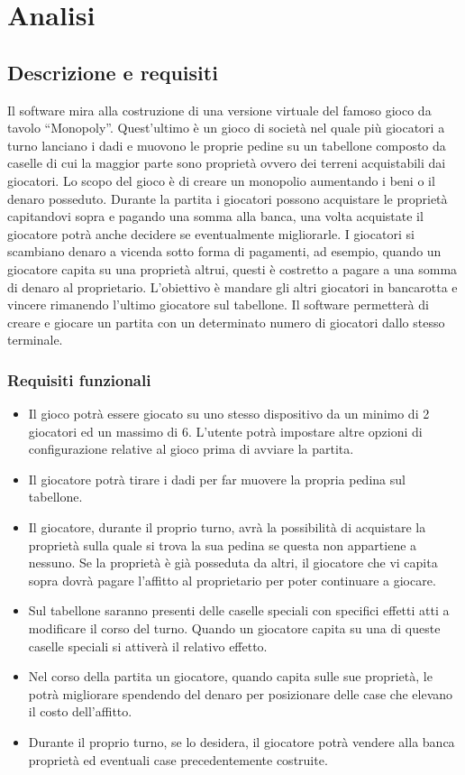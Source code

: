 \chapter{Analisi}

\section{Descrizione e requisiti}

Il software mira alla costruzione di una versione virtuale del famoso gioco da tavolo “Monopoly”. 
Quest’ultimo è un gioco di società nel quale più giocatori a turno lanciano i dadi e muovono le proprie pedine su un tabellone 
composto da caselle di cui la maggior parte sono proprietà ovvero dei terreni acquistabili dai giocatori.
Lo scopo del gioco è di creare un monopolio aumentando i beni o il denaro posseduto. 
Durante la partita i giocatori possono acquistare le proprietà capitandovi sopra e pagando una somma alla banca, una volta acquistate il giocatore potrà anche decidere se eventualmente migliorarle.
I giocatori si scambiano denaro a vicenda sotto forma di pagamenti, ad esempio, quando un giocatore capita su una proprietà altrui, questi è costretto a pagare
a una somma di denaro al proprietario. 
L’obiettivo è mandare gli altri giocatori in bancarotta e vincere rimanendo l'ultimo giocatore sul tabellone. 
Il software permetterà di creare e giocare un partita con un determinato numero di giocatori dallo 
stesso terminale.



\subsection*{Requisiti funzionali}
\begin{itemize}
    \item Il gioco potrà essere giocato su uno stesso dispositivo da un minimo di 2 giocatori ed un massimo di 6. L'utente
    potrà impostare altre opzioni di configurazione relative al gioco prima di avviare la partita.
	\item Il giocatore potrà tirare i dadi per far muovere la propria pedina sul tabellone.
	\item Il giocatore, durante il proprio turno, avrà la possibilità di acquistare la proprietà sulla quale 
    si trova la sua pedina se questa non appartiene a nessuno. Se la proprietà è già posseduta da altri, 
    il giocatore che vi capita sopra dovrà pagare l’affitto al proprietario per poter continuare a giocare.
    \item Sul tabellone saranno presenti delle caselle speciali con specifici effetti atti a modificare il corso del turno. Quando un giocatore 
    capita su una di queste caselle speciali si attiverà il relativo effetto.
    \item Nel corso della partita un giocatore, quando capita sulle sue proprietà, le potrà migliorare spendendo
    del denaro per posizionare delle case che elevano il costo dell’affitto.
    \item Durante il proprio turno, se lo desidera, il giocatore potrà vendere alla banca 
    proprietà ed eventuali case precedentemente costruite.
\end{itemize}


